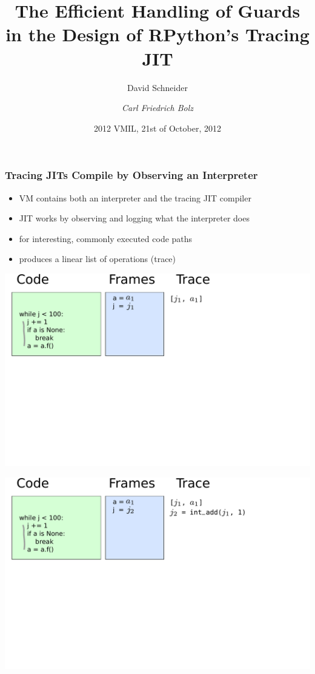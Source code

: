\documentclass[utf8x]{beamer}
\title{The Efficient Handling of Guards in the Design of RPython's Tracing JIT}
\author[David Schneider, Carl Friedrich Bolz]{David Schneider \and \emph{Carl Friedrich Bolz}}
\institute[Heinrich-Heine-Universität Düsseldorf]{
Heinrich-Heine-Universität Düsseldorf, STUPS Group, Germany
}
\date{2012 VMIL, 21st of October, 2012}
\begin{document}
\begin{frame}
  \titlepage
\end{frame}


\begin{frame}
  \frametitle{Tracing JITs Compile by Observing an Interpreter}
  \begin{itemize}
      \item VM contains both an interpreter and the tracing JIT compiler
      \item JIT works by observing and logging what the interpreter does
      \item for interesting, commonly executed code paths
      \item produces a linear list of operations (trace)
  \end{itemize}
\end{frame}

\begin{frame}
  \includegraphics[scale=0.4]{figures/loop01}
\end{frame}

\begin{frame}
  \includegraphics[scale=0.4]{figures/loop02}
\end{frame}
\end{document}
